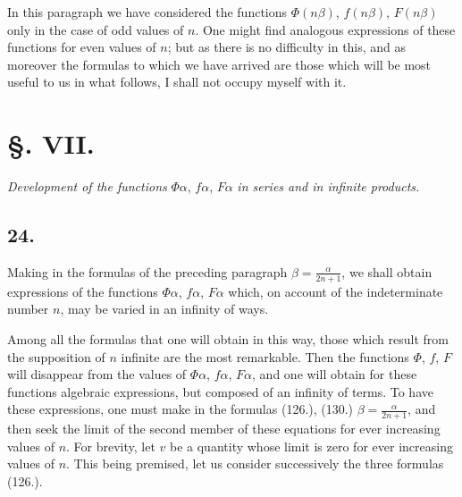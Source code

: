 \documentclass{article}
\begin{document}
In this paragraph we have considered the functions $\Phi(n\beta)$, $f(n\beta)$, $F(n\beta)$ only in the case of odd values of $n$. One might find analogous expressions of these functions for even values of $n$; but as there is no difficulty in this, and as moreover the formulas to which we have arrived are those which will be most useful to us in what follows, I shall not occupy myself with it.

\section*{§. VII.}

\emph{Development of the functions} $\Phi\alpha$, $f\alpha$, $F\alpha$ \emph{in series and in infinite products.}

\subsection*{24.}

Making in the formulas of the preceding paragraph $\beta=\frac{\alpha}{2n+1}$, we shall obtain expressions of the functions $\Phi\alpha$, $f\alpha$, $F\alpha$ which, on account of the indeterminate number $n$, may be varied in an infinity of ways.

Among all the formulas that one will obtain in this way, those which result from the supposition of $n$ infinite are the most remarkable. Then the functions $\Phi$, $f$, $F$ will disappear from the values of $\Phi\alpha$, $f\alpha$, $F\alpha$, and one will obtain for these functions algebraic expressions, but composed of an infinity of terms. To have these expressions, one must make in the formulas (126.), (130.) $\beta=\frac{\alpha}{2n+1}$, and then seek the limit of the second member of these equations for ever increasing values of $n$. For brevity, let $v$ be a quantity whose limit is zero for ever increasing values of $n$. This being premised, let us consider successively the three formulas (126.).
\end{document}
